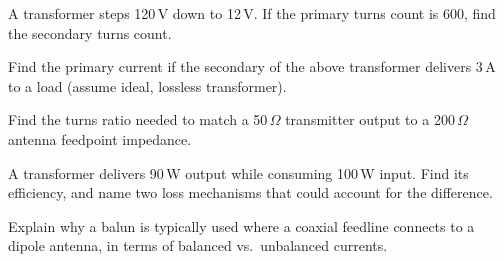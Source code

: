 \begin{practiceproblems}
\item A transformer steps 120\,V down to 12\,V. If the primary turns
count is 600, find the secondary turns count.
\item Find the primary current if the secondary of the above transformer
delivers 3\,A to a load (assume ideal, lossless transformer).
\item Find the turns ratio needed to match a 50\,$\Omega$ transmitter
output to a 200\,$\Omega$ antenna feedpoint impedance.
\item A transformer delivers 90\,W output while consuming 100\,W input.
Find its efficiency, and name two loss mechanisms that could account for
the difference.
\item Explain why a balun is typically used where a coaxial feedline
connects to a dipole antenna, in terms of balanced vs.\ unbalanced
currents.
\end{practiceproblems}
